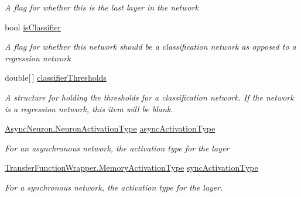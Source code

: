 \begin{DoxyCompactItemize}
\begin{DoxyCompactList}\small\item\em A flag for whether this is the last layer in the network \end{DoxyCompactList}\item 
bool \hyperlink{class_n_n_gen_1_1_layer_setup_adbccceab05f4b3f3f7aba558408f4e94}{is\+Classifier}
\begin{DoxyCompactList}\small\item\em A flag for whether this network should be a classification network as opposed to a regression network \end{DoxyCompactList}\item 
double\mbox{[}$\,$\mbox{]} \hyperlink{class_n_n_gen_1_1_layer_setup_afd7deda67d710ebec7628b2eec8f484b}{classifier\+Thresholds}
\begin{DoxyCompactList}\small\item\em A structure for holding the thresholds for a classification network. If the network is a regression network, this item will be blank. \end{DoxyCompactList}\item 
\hyperlink{class_n_n_gen_1_1_async_neuron_afe8460a52808d1587cbcc0a8e4e23b64}{Async\+Neuron.\+Neuron\+Activation\+Type} \hyperlink{class_n_n_gen_1_1_layer_setup_a7b3a1f35136f4ba1abc63ef61d2733f3}{async\+Activation\+Type}
\begin{DoxyCompactList}\small\item\em For an asynchronous network, the activation type for the layer \end{DoxyCompactList}\item 
\hyperlink{class_n_n_gen_1_1_transfer_function_wrapper_aa338ffadb8fcdf76df75419374a51ff6}{Transfer\+Function\+Wrapper.\+Memory\+Activation\+Type} \hyperlink{class_n_n_gen_1_1_layer_setup_a305c28b6f6a27e7f729362e63280e997}{sync\+Activation\+Type}
\begin{DoxyCompactList}\small\item\em For a synchronous network, the activation type for the layer. \end{DoxyCompactList}\end{DoxyCompactItemize}


